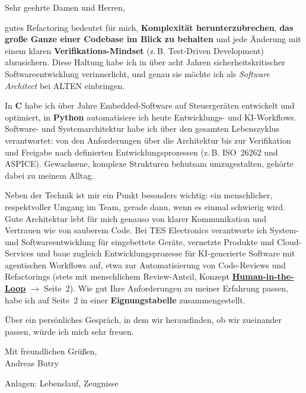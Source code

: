 \documentclass[10pt,a4paper]{moderncv}
\begin{document}
Sehr geehrte Damen und Herren,

\medskip

gutes Refactoring bedeutet für mich, \textbf{Komplexität
herunterzubrechen}, \textbf{das große Ganze einer Codebase im Blick zu behalten}
und jede Änderung mit einem klaren \textbf{Verifikations-Mindset} (z.\,B. Test-Driven Development) abzusichern.
Diese Haltung habe ich in über acht Jahren sicherheitskritischer
Softwareentwicklung verinnerlicht, und genau sie möchte ich als
\emph{Software Architect} bei ALTEN einbringen.

In \textbf{C} habe ich über Jahre Embedded-Software auf Steuergeräten entwickelt
und optimiert, in \textbf{Python} automatisiere ich heute Entwicklungs- und
KI-Workflows. Software- und Systemarchitektur habe ich über den gesamten
Lebenszyklus verantwortet: von den Anforderungen über die Architektur bis zur
Verifikation und Freigabe nach definierten Entwicklungsprozessen (z.\,B.
ISO~26262 und ASPICE). Gewachsene, komplexe
Strukturen behutsam umzugestalten, gehörte dabei zu meinem Alltag.

Neben der Technik ist mir ein Punkt besonders wichtig: ein menschlicher,
respektvoller Umgang im Team, gerade dann, wenn es einmal schwierig wird. Gute
Architektur lebt für mich genauso von klarer Kommunikation und Vertrauen wie von
sauberem Code. Bei TES Electronics verantworte ich System- und
Softwareentwicklung für eingebettete Geräte, vernetzte Produkte und
Cloud-Services und baue zugleich Entwicklungsprozesse für KI-generierte Software
mit agentischen Workflows auf, etwa zur Automatisierung von Code-Reviews und
Refactorings (stets mit menschlichem Review-Anteil, Konzept
\hyperlink{hitl}{\textbf{Human-in-the-Loop}} $\rightarrow$ Seite~2). Wie gut Ihre Anforderungen zu meiner Erfahrung
passen, habe ich auf Seite~2 in einer \textbf{Eignungstabelle} zusammengestellt.

Über ein persönliches Gespräch, in dem wir herausfinden, ob wir zueinander
passen, würde ich mich sehr freuen.

\bigskip
Mit freundlichen Grüßen,\\[2.0em]
Andreas Butry

\medskip
{\small\color{light}Anlagen: Lebenslauf, Zeugnisse}
\end{document}
